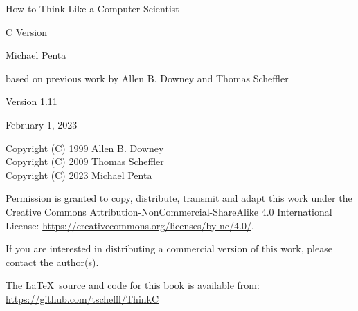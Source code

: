 \documentclass[a4paper]{book}
\begin{document}
\thispagestyle{empty}

\begin{flushright}
\vspace*{2.5in}

{\huge How to Think Like a Computer Scientist}

\vspace{0.25in}

{\LARGE C Version}

\vspace{1in}

{\Large Michael Penta}

{based on previous work by Allen B. Downey and Thomas Scheffler}

\vspace{1in}

{\Large Version 1.11}

{\small February 1, 2023}
\vfill

\end{flushright}



Copyright (C) 1999  Allen B. Downey\\
Copyright (C) 2009  Thomas Scheffler\\
Copyright (C) 2023 Michael Penta\\

\vspace{0.25in}

Permission is granted to copy, distribute, transmit and adapt this
work under the Creative Commons Attribution-NonCommercial-ShareAlike 4.0
International License: \url{https://creativecommons.org/licenses/by-nc/4.0/}.

If you are interested in distributing a commercial version of this
work, please contact the author(s).

The \LaTeX\ source and code for this book is available from: \\
\url{https://github.com/tscheffl/ThinkC}

\frontmatter
\tableofcontents


\mainmatter




%
%
%
%
%


\appendix



\printindex

\end{document}
